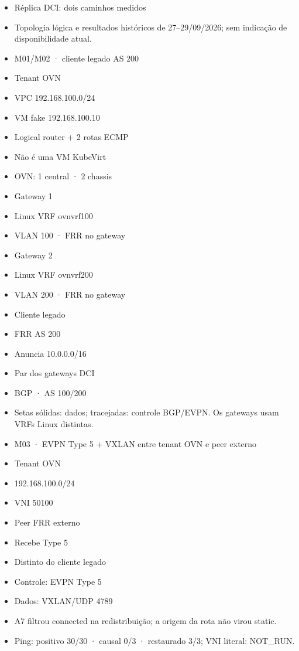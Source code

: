 \documentclass[12pt,openany,oneside,a4paper,chapter=TITLE,english,brazil]{abntex2}
\providecommand{\tightlist}{\setlength{\itemsep}{0pt}\setlength{\parskip}{0pt}}
\begin{document}
\begin{itemize}
\tightlist
\item
  Réplica DCI: dois caminhos medidos
\item
  Topologia lógica e resultados históricos de 27--29/09/2026; sem indicação de disponibilidade atual.
\item
  M01/M02 · cliente legado AS 200
\item
  Tenant OVN
\item
  VPC 192.168.100.0/24
\item
  VM fake 192.168.100.10
\item
  Logical router + 2 rotas ECMP
\item
  Não é uma VM KubeVirt
\item
  OVN: 1 central · 2 chassis
\item
  Gateway 1
\item
  Linux VRF ovnvrf100
\item
  VLAN 100 · FRR no gateway
\item
  Gateway 2
\item
  Linux VRF ovnvrf200
\item
  VLAN 200 · FRR no gateway
\item
  Cliente legado
\item
  FRR AS 200
\item
  Anuncia 10.0.0.0/16
\item
  Par dos gateways DCI
\item
  BGP · AS 100/200
\item
  Setas sólidas: dados; tracejadas: controle BGP/EVPN. Os gateways usam VRFs Linux distintas.
\item
  M03 · EVPN Type 5 + VXLAN entre tenant OVN e peer externo
\item
  Tenant OVN
\item
  192.168.100.0/24
\item
  VNI 50100
\item
  Peer FRR externo
\item
  Recebe Type 5
\item
  Distinto do cliente legado
\item
  Controle: EVPN Type 5
\item
  Dados: VXLAN/UDP 4789
\item
  A7 filtrou connected na redistribuição; a origem da rota não virou static.
\item
  Ping: positivo 30/30 · causal 0/3 · restaurado 3/3; VNI literal: NOT\_RUN.
\end{itemize}
\end{document}
